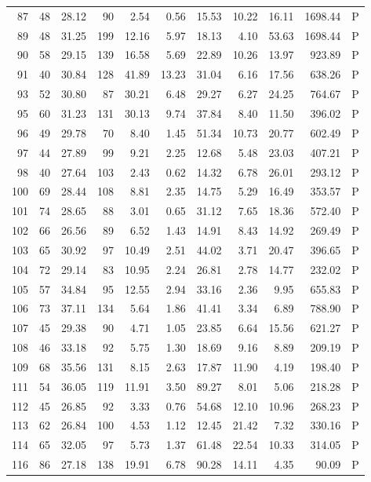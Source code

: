 \begin{table}[ht]
\begin{tabular}{rrrrrrrrrrl}
  87 &  48 & 28.12 &  90 & 2.54 & 0.56 & 15.53 & 10.22 & 16.11 & 1698.44 & P \\ 
  89 &  48 & 31.25 & 199 & 12.16 & 5.97 & 18.13 & 4.10 & 53.63 & 1698.44 & P \\ 
  90 &  58 & 29.15 & 139 & 16.58 & 5.69 & 22.89 & 10.26 & 13.97 & 923.89 & P \\ 
  91 &  40 & 30.84 & 128 & 41.89 & 13.23 & 31.04 & 6.16 & 17.56 & 638.26 & P \\ 
  93 &  52 & 30.80 &  87 & 30.21 & 6.48 & 29.27 & 6.27 & 24.25 & 764.67 & P \\ 
  95 &  60 & 31.23 & 131 & 30.13 & 9.74 & 37.84 & 8.40 & 11.50 & 396.02 & P \\ 
  96 &  49 & 29.78 &  70 & 8.40 & 1.45 & 51.34 & 10.73 & 20.77 & 602.49 & P \\ 
  97 &  44 & 27.89 &  99 & 9.21 & 2.25 & 12.68 & 5.48 & 23.03 & 407.21 & P \\ 
  98 &  40 & 27.64 & 103 & 2.43 & 0.62 & 14.32 & 6.78 & 26.01 & 293.12 & P \\ 
  100 &  69 & 28.44 & 108 & 8.81 & 2.35 & 14.75 & 5.29 & 16.49 & 353.57 & P \\ 
  101 &  74 & 28.65 &  88 & 3.01 & 0.65 & 31.12 & 7.65 & 18.36 & 572.40 & P \\ 
  102 &  66 & 26.56 &  89 & 6.52 & 1.43 & 14.91 & 8.43 & 14.92 & 269.49 & P \\ 
  103 &  65 & 30.92 &  97 & 10.49 & 2.51 & 44.02 & 3.71 & 20.47 & 396.65 & P \\ 
  104 &  72 & 29.14 &  83 & 10.95 & 2.24 & 26.81 & 2.78 & 14.77 & 232.02 & P \\ 
  105 &  57 & 34.84 &  95 & 12.55 & 2.94 & 33.16 & 2.36 & 9.95 & 655.83 & P \\ 
  106 &  73 & 37.11 & 134 & 5.64 & 1.86 & 41.41 & 3.34 & 6.89 & 788.90 & P \\ 
  107 &  45 & 29.38 &  90 & 4.71 & 1.05 & 23.85 & 6.64 & 15.56 & 621.27 & P \\ 
  108 &  46 & 33.18 &  92 & 5.75 & 1.30 & 18.69 & 9.16 & 8.89 & 209.19 & P \\ 
  109 &  68 & 35.56 & 131 & 8.15 & 2.63 & 17.87 & 11.90 & 4.19 & 198.40 & P \\ 
  111 &  54 & 36.05 & 119 & 11.91 & 3.50 & 89.27 & 8.01 & 5.06 & 218.28 & P \\ 
  112 &  45 & 26.85 &  92 & 3.33 & 0.76 & 54.68 & 12.10 & 10.96 & 268.23 & P \\ 
  113 &  62 & 26.84 & 100 & 4.53 & 1.12 & 12.45 & 21.42 & 7.32 & 330.16 & P \\ 
  114 &  65 & 32.05 &  97 & 5.73 & 1.37 & 61.48 & 22.54 & 10.33 & 314.05 & P \\ 
  116 &  86 & 27.18 & 138 & 19.91 & 6.78 & 90.28 & 14.11 & 4.35 & 90.09 & P \\ 
   \hline
\end{tabular}
\end{table}
